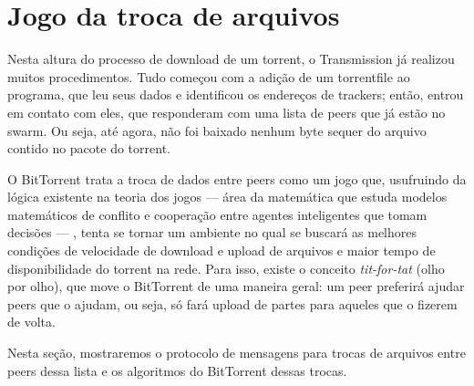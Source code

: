 
\section{Jogo da troca de arquivos}
\label{sec:titfortat}

Nesta altura do processo de download de um \gls*{torrent}, o Transmission já realizou
muitos procedimentos. Tudo começou com a adição de um \gls*{torrentfile} ao programa,
que leu seus dados e identificou os endereços de \glspl*{tracker}; então, entrou em
contato com eles, que responderam com uma lista de \glspl*{peer} que já estão no
\gls*{swarm}. Ou seja, até agora, não foi baixado nenhum byte sequer do arquivo contido
no pacote do \gls*{torrent}.

O BitTorrent trata a troca de dados entre \glspl*{peer} como um jogo que, usufruindo
da lógica existente na teoria dos jogos --- área da matemática que estuda modelos
matemáticos de conflito e cooperação entre agentes inteligentes que tomam decisões ---
, tenta se tornar um ambiente no qual se buscará as melhores condições de velocidade
de download e upload de arquivos e maior tempo de disponibilidade do \gls*{torrent} na
rede. Para isso, existe o conceito \emph{tit-for-tat} (olho por olho), que move o
BitTorrent de uma maneira geral: um \gls*{peer} preferirá ajudar \glspl*{peer} que o
ajudam, ou seja, só fará upload de partes para aqueles que o fizerem de volta.

Nesta seção, mostraremos o protocolo de mensagens para trocas de arquivos entre
\glspl*{peer} dessa lista e os algoritmos do BitTorrent dessas trocas.







